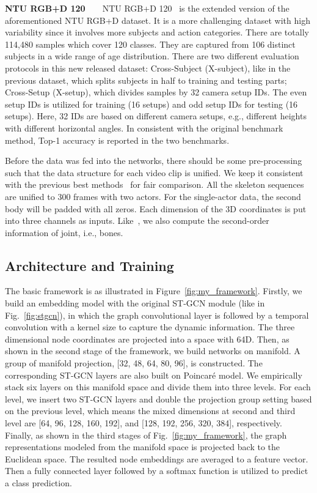 \documentclass[letterpaper]{article} \usepackage{aaai19}  \usepackage{times}  \usepackage{helvet} \usepackage{courier}  \usepackage[hyphens]{url}  \usepackage{graphicx} \urlstyle{rm} \def\UrlFont{\rm}  \usepackage{graphicx}  \frenchspacing  \setlength{\pdfpagewidth}{8.5in}  \setlength{\pdfpageheight}{11in}
\begin{document}
\textbf{NTU RGB+D 120}~~~~NTU RGB+D 120~\cite{liu2019ntu} is the extended version of the aforementioned NTU RGB+D dataset. It is a more challenging dataset with high variability since it involves more subjects and action categories. There are totally 114,480 samples which cover 120 classes. They are captured from 106 distinct subjects in a wide range of age distribution. There are two different evaluation protocols in this new released dataset: Cross-Subject (X-subject), like in the previous dataset, which splits subjects in half to training and testing parts; Cross-Setup (X-setup), which divides samples by 32 camera setup IDs. The even setup IDs is utilized for training (16 setups) and odd setup IDs for testing (16 setups). Here, 32 IDs are based on different camera setups, e.g., different heights with different horizontal angles. In consistent with the original benchmark method, Top-1 accuracy is reported in the two benchmarks. 

Before the data was fed into the networks, there should be some pre-processing such that the data structure for each video clip is unified. We keep it consistent with the previous best methods~\cite{shi2019two,peng2020learning} for fair comparison. All the skeleton sequences are unified to 300 frames with two actors. For the single-actor data, the second body  will be padded with all zeros. Each dimension of the 3D coordinates is put into three channels as inputs. Like~\cite{shi2019two,peng2020learning}, we also compute the second-order information of joint, i.e., bones.

\subsection{Architecture and Training}

The basic framework is as illustrated in Figure~\ref{fig:my_framework}. Firstly, we build an embedding model with the original ST-GCN module (like in Fig.~\ref{fig:stgcn}), in which the graph convolutional layer is followed by a temporal convolution with a kernel size  to capture the dynamic information. The three dimensional node coordinates are projected into a space with 64D.   Then, as shown in the second stage of the framework, we build networks on manifold. A group of manifold projection, [32, 48, 64, 80, 96], is constructed. The corresponding ST-GCN layers are also built on Poincar\'e model. We empirically stack six layers on this manifold space and divide them into three levels. For each level, we insert two ST-GCN layers and double the projection group setting based on the previous level, which means the mixed dimensions at second and third level are [64, 96, 128, 160, 192], and [128, 192, 256, 320, 384], respectively. Finally, as shown in the third stages of Fig.~\ref{fig:my_framework}, the graph representations modeled from the manifold space is projected back to the Euclidean space. The resulted node embeddings are averaged to a feature vector. Then a fully connected layer followed by a softmax function is utilized to predict a class prediction. 
\end{document}
